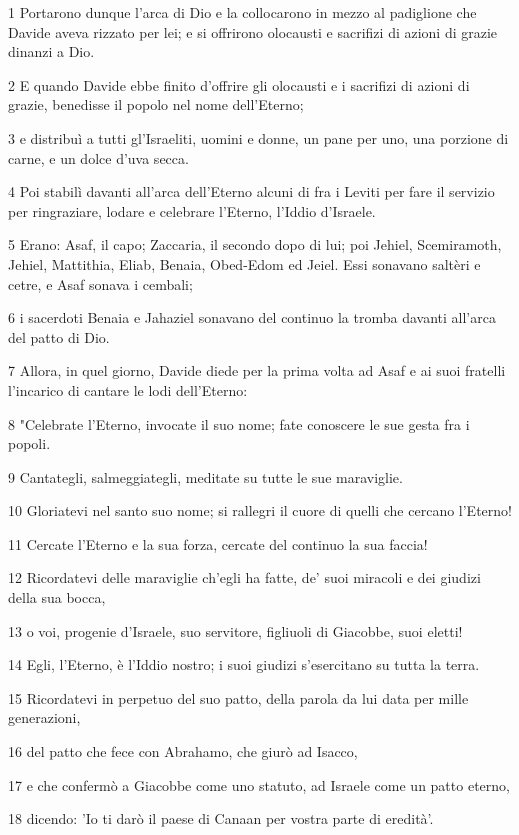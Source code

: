 \par 1 Portarono dunque l'arca di Dio e la collocarono in mezzo al padiglione che Davide aveva rizzato per lei; e si offrirono olocausti e sacrifizi di azioni di grazie dinanzi a Dio.
\par 2 E quando Davide ebbe finito d'offrire gli olocausti e i sacrifizi di azioni di grazie, benedisse il popolo nel nome dell'Eterno;
\par 3 e distribuì a tutti gl'Israeliti, uomini e donne, un pane per uno, una porzione di carne, e un dolce d'uva secca.
\par 4 Poi stabilì davanti all'arca dell'Eterno alcuni di fra i Leviti per fare il servizio per ringraziare, lodare e celebrare l'Eterno, l'Iddio d'Israele.
\par 5 Erano: Asaf, il capo; Zaccaria, il secondo dopo di lui; poi Jehiel, Scemiramoth, Jehiel, Mattithia, Eliab, Benaia, Obed-Edom ed Jeiel. Essi sonavano saltèri e cetre, e Asaf sonava i cembali;
\par 6 i sacerdoti Benaia e Jahaziel sonavano del continuo la tromba davanti all'arca del patto di Dio.
\par 7 Allora, in quel giorno, Davide diede per la prima volta ad Asaf e ai suoi fratelli l'incarico di cantare le lodi dell'Eterno:
\par 8 "Celebrate l'Eterno, invocate il suo nome; fate conoscere le sue gesta fra i popoli.
\par 9 Cantategli, salmeggiategli, meditate su tutte le sue maraviglie.
\par 10 Gloriatevi nel santo suo nome; si rallegri il cuore di quelli che cercano l'Eterno!
\par 11 Cercate l'Eterno e la sua forza, cercate del continuo la sua faccia!
\par 12 Ricordatevi delle maraviglie ch'egli ha fatte, de' suoi miracoli e dei giudizi della sua bocca,
\par 13 o voi, progenie d'Israele, suo servitore, figliuoli di Giacobbe, suoi eletti!
\par 14 Egli, l'Eterno, è l'Iddio nostro; i suoi giudizi s'esercitano su tutta la terra.
\par 15 Ricordatevi in perpetuo del suo patto, della parola da lui data per mille generazioni,
\par 16 del patto che fece con Abrahamo, che giurò ad Isacco,
\par 17 e che confermò a Giacobbe come uno statuto, ad Israele come un patto eterno,
\par 18 dicendo: 'Io ti darò il paese di Canaan per vostra parte di eredità'.
